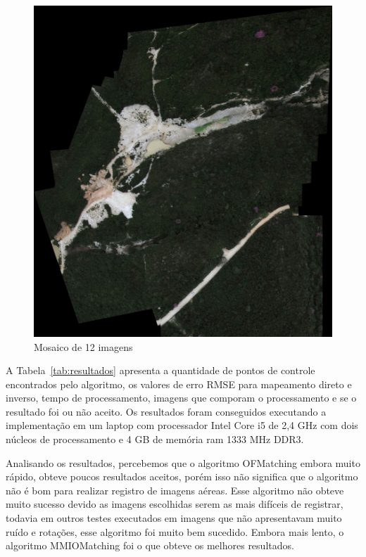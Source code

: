 \documentclass[9pt, a4paper, nofonttune, journal]{IEEEtran}
\begin{document}
\begin{figure}[!b]
\begin{center}
\includegraphics[scale=0.30]{figuras/mosaico}
\caption{Mosaico de 12 imagens}
\label{fig:mosaico}
\end{center}
\end{figure}

A Tabela~\ref{tab:resultados} apresenta a quantidade de pontos de controle encontrados pelo algoritmo, os valores de erro RMSE para mapeamento direto e inverso, tempo de processamento, imagens que comporam o processamento e se o resultado foi ou não aceito. Os resultados foram conseguidos executando a implementação em um laptop com processador Intel Core i5 de 2,4 GHz com dois núcleos de processamento e 4 GB de memória ram 1333 MHz DDR3.

Analisando os resultados, percebemos que o algoritmo OFMatching embora muito rápido, obteve poucos resultados aceitos, porém isso não significa que o algoritmo não é bom para realizar registro de imagens aéreas. Esse algoritmo não obteve muito sucesso devido as imagens escolhidas serem as mais difíceis de registrar, todavia em outros testes executados em imagens que não apresentavam muito ruído e rotações, esse algoritmo foi muito bem sucedido. Embora mais lento, o algoritmo MMIOMatching foi o que obteve os melhores resultados.
\end{document}
